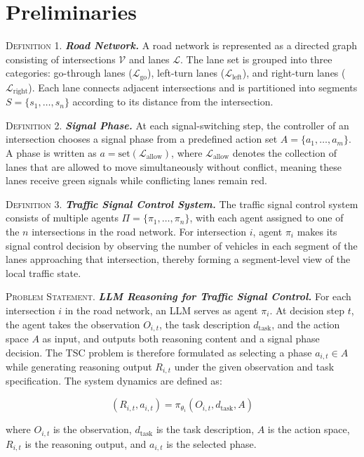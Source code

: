 \section{Preliminaries}

\textsc{Definition 1.} \textbf{\textit{Road Network.}} A road network is represented as a directed graph consisting of intersections $\mathcal{V}$ and lanes $\mathcal{L}$. The lane set is grouped into three categories: go-through lanes ($\mathcal{L}_{\mathrm{go}}$), left-turn lanes ($\mathcal{L}_{\mathrm{left}}$), and right-turn lanes ($\mathcal{L}_{\mathrm{right}}$). Each lane connects adjacent intersections and is partitioned into segments $S = \{s_1, \ldots, s_n\}$ according to its distance from the intersection.

\textsc{Definition 2.} \textbf{\textit{Signal Phase.}} At each signal-switching step, the controller of an intersection chooses a signal phase from a predefined action set $A = \{a_1, \ldots, a_m\}$. A phase is written as $a = \mathrm{set}(\mathcal{L}_{\mathrm{allow}})$, where $\mathcal{L}_{\mathrm{allow}}$ denotes the collection of lanes that are allowed to move simultaneously without conflict, meaning these lanes receive green signals while conflicting lanes remain red.

\textsc{Definition 3.} \textbf{\textit{Traffic Signal Control System.}} The traffic signal control system consists of multiple agents $\Pi = \{\pi_1, \ldots, \pi_n\}$, with each agent assigned to one of the $n$ intersections in the road network. For intersection $i$, agent $\pi_i$ makes its signal control decision by observing the number of vehicles in each segment of the lanes approaching that intersection, thereby forming a segment-level view of the local traffic state.

\textsc{Problem Statement.} \textbf{\textit{LLM Reasoning for Traffic Signal Control.}} For each intersection $i$ in the road network, an LLM serves as agent $\pi_i$. At decision step $t$, the agent takes the observation $O_{i,t}$, the task description $d_{\mathrm{task}}$, and the action space $A$ as input, and outputs both reasoning content and a signal phase decision. The TSC problem is therefore formulated as selecting a phase $a_{i,t} \in A$ while generating reasoning output $R_{i,t}$ under the given observation and task specification. The system dynamics are defined as:

\begin{equation}
(R_{i,t}, a_{i,t}) = \pi_{\theta_i}(O_{i,t}, d_{\mathrm{task}}, A)
\end{equation}

where $O_{i,t}$ is the observation, $d_{\mathrm{task}}$ is the task description, $A$ is the action space, $R_{i,t}$ is the reasoning output, and $a_{i,t}$ is the selected phase.
